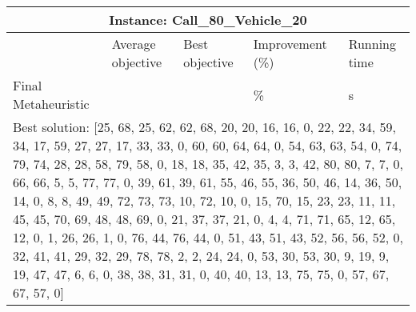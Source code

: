 \documentclass[]{article}
\begin{document}
\begin{table}[!ht]
	\hskip-1.3cm\begin{tabular}{|m{3.2cm}|>{\centering\arraybackslash}m{2.8cm}|>{\centering\arraybackslash}m{2.8cm}|>{\centering\arraybackslash}m{2.8cm}|>{\centering\arraybackslash}m{2.8cm}|}
		\hline
		\multicolumn{5}{|c|}{Instance: Call\_80\_Vehicle\_20}\\
		\hline
		& Average objective & Best objective & Improvement (\%) & Running time\\
		\hline
		Final Metaheuristic & 10481208.00 & 10340869.00 & 77.885796 \% & 900.010 s\\
		\hline
		\multicolumn{5}{|m{14cm}|}{Best solution: [25, 68, 25, 62, 62, 68, 20, 20, 16, 16, 0, 22, 22, 34, 59, 34, 17, 59, 27, 27, 17, 33, 33, 0, 60, 60, 64, 64, 0, 54, 63, 63, 54, 0, 74, 79, 74, 28, 28, 58, 79, 58, 0, 18, 18, 35, 42, 35, 3, 3, 42, 80, 80, 7, 7, 0, 66, 66, 5, 5, 77, 77, 0, 39, 61, 39, 61, 55, 46, 55, 36, 50, 46, 14, 36, 50, 14, 0, 8, 8, 49, 49, 72, 73, 73, 10, 72, 10, 0, 15, 70, 15, 23, 23, 11, 11, 45, 45, 70, 69, 48, 48, 69, 0, 21, 37, 37, 21, 0, 4, 4, 71, 71, 65, 12, 65, 12, 0, 1, 26, 26, 1, 0, 76, 44, 76, 44, 0, 51, 43, 51, 43, 52, 56, 56, 52, 0, 32, 41, 41, 29, 32, 29, 78, 78, 2, 2, 24, 24, 0, 53, 30, 53, 30, 9, 19, 9, 19, 47, 47, 6, 6, 0, 38, 38, 31, 31, 0, 40, 40, 13, 13, 75, 75, 0, 57, 67, 67, 57, 0]}\\
		\hline
	\end{tabular}
\end{table}
\end{document}
